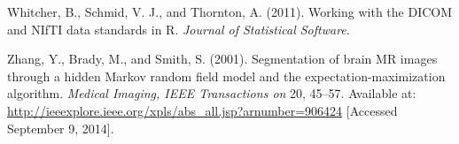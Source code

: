 \documentclass[utf8]{frontiersSCNS}
\begin{document}
\leavevmode\hypertarget{ref-orodicom}{}%
Whitcher, B., Schmid, V. J., and Thornton, A. (2011). Working with the DICOM and NIfTI data standards in R. \emph{Journal of Statistical Software}.

\leavevmode\hypertarget{ref-zhang_segmentation_2001}{}%
Zhang, Y., Brady, M., and Smith, S. (2001). Segmentation of brain MR images through a hidden Markov random field model and the expectation-maximization algorithm. \emph{Medical Imaging, IEEE Transactions on} 20, 45--57. Available at: \url{http://ieeexplore.ieee.org/xpls/abs_all.jsp?arnumber=906424} {[}Accessed September 9, 2014{]}.
\end{document}
